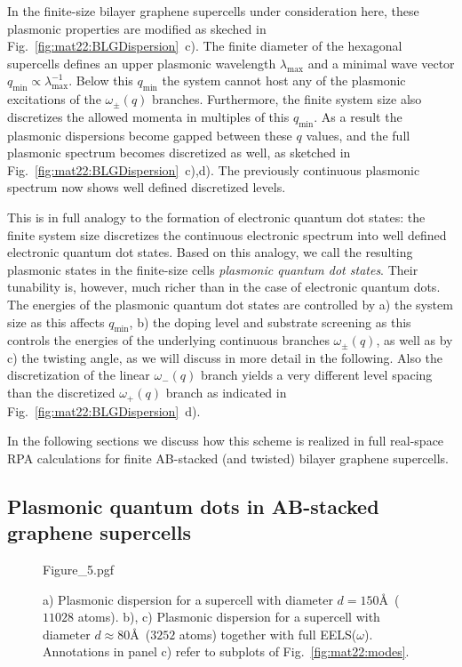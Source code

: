 In the finite-size bilayer graphene supercells under consideration here, these plasmonic properties are modified as skeched in Fig.~\ref{fig:mat22:BLGDispersion}~c). The finite diameter of the hexagonal supercells defines an upper plasmonic wavelength $\lambda_\text{max}$ and a minimal wave vector $q_\text{min} \propto \lambda_\text{max}^{-1}$. Below this $q_\text{min}$ the system cannot host any of the plasmonic excitations of the $\omega_{\pm}(q)$ branches. Furthermore, the finite system size also discretizes the allowed momenta in multiples of this $q_\text{min}$. As a result the plasmonic dispersions become gapped between these $q$ values, and the full plasmonic spectrum becomes discretized as well, as sketched in Fig.~\ref{fig:mat22:BLGDispersion}~c),d). The previously continuous plasmonic spectrum now shows well defined discretized levels.

This is in full analogy to the formation of electronic quantum dot states: the finite system size discretizes the continuous electronic spectrum into well defined electronic quantum dot states. Based on this analogy, we call the resulting plasmonic states in the finite-size cells \emph{plasmonic quantum dot states}.  Their tunability is, however, much richer than in the case of electronic quantum dots. The energies of the plasmonic quantum dot states are controlled by a) the system size as this affects $q_\text{min}$, b) the doping level and substrate screening as this controls the energies of the underlying continuous branches $\omega_{\pm}(q)$, as well as by c) the twisting angle, as we will discuss in more detail in the following. Also the discretization of the linear $\omega_-(q)$ branch yields a very different level spacing than the discretized $\omega_+(q)$ branch as indicated in Fig.~\ref{fig:mat22:BLGDispersion}~d).

In the following sections we discuss how this scheme is realized in full real-space RPA calculations for finite AB-stacked (and twisted) bilayer graphene supercells.
    
\subsection{Plasmonic quantum dots in AB-stacked graphene supercells}
    
\begin{figure}
    \centering
    {Figure_5.pgf}
    \caption{a) Plasmonic dispersion for a supercell with diameter $d=150$\AA\ ($11028$ atoms). b), c) Plasmonic dispersion for a supercell with diameter $d\approx80$\AA\ ($3252$ atoms) together with full EELS($\omega$). Annotations in panel c) refer to subplots of Fig.~\ref{fig:mat22:modes}.}
    \label{fig:mat22:EELS}
\end{figure}
        
